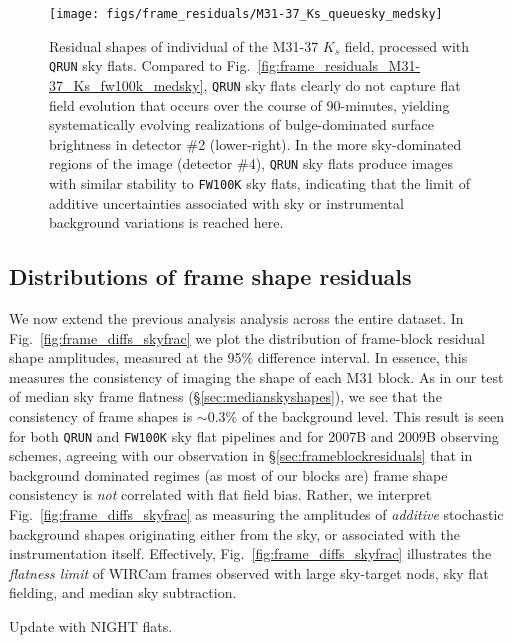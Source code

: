 \documentclass[iop]{emulateapj}
\newcommand{\todo}[1]{\textcolor{BurntOrange}{\textsf{#1}}} %
\newcommand{\Fig}[1]{Fig.~\ref{fig:#1}}  %
\newcommand{\Sec}[1]{\S\ref{sec:#1}}  %
\begin{document}
\begin{figure}[p]
\centering
\texttt{[image: figs/frame\_residuals/M31-37\_Ks\_queuesky\_medsky]}
\caption{Residual shapes of individual of the M31-37 $K_s$ field, processed with \texttt{QRUN} sky flats.
Compared to \Fig{frame_residuals_M31-37_Ks_fw100k_medsky}, \texttt{QRUN} sky flats clearly do not capture flat field evolution that occurs over the course of 90-minutes, yielding systematically evolving realizations of bulge-dominated surface brightness in detector \#2 (lower-right). In the more sky-dominated regions of the image (detector \#4), \texttt{QRUN} sky flats produce images with similar stability to \texttt{FW100K} sky flats, indicating that the limit of additive uncertainties associated with sky or instrumental background variations is reached here.}
\label{fig:frame_residuals_M31-37_Ks_QRUN}
\end{figure}

\subsection{Distributions of frame shape residuals}
\label{sec:frameblockresidualhist}

We now extend the previous analysis analysis across the entire dataset.
In \Fig{frame_diffs_skyfrac} we plot the distribution of frame-block residual shape amplitudes, measured at the 95\% difference interval.
In essence, this measures the consistency of imaging the shape of each M31 block.
As in our test of median sky frame flatness (\Sec{medianskyshapes}), we see that the consistency of frame shapes is $\sim 0.3\%$ of the background level.
This result is seen for both \texttt{QRUN} and \texttt{FW100K} sky flat pipelines and for 2007B and 2009B observing schemes, agreeing with our observation in \Sec{frameblockresiduals} that in background dominated regimes (as most of our blocks are) frame shape consistency is \emph{not} correlated with flat field bias.
Rather, we interpret \Fig{frame_diffs_skyfrac} as measuring the amplitudes of \emph{additive} stochastic background shapes originating either from the sky, or associated with the instrumentation itself.
Effectively, \Fig{frame_diffs_skyfrac} illustrates the \emph{flatness limit} of WIRCam frames observed with large sky-target nods, sky flat fielding, and median sky subtraction.

\todo{Update with NIGHT flats}.
\end{document}
